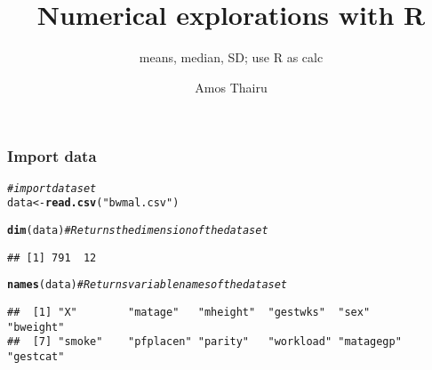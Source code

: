 \documentclass[pdf]{beamer}\usepackage[]{graphicx}\usepackage[]{color}
\title{Numerical explorations with R}
\subtitle{means, median, SD; use R as calc}
\author{Amos Thairu}
\makeatletter
\newcommand{\hlstr}[1]{\textcolor[rgb]{0.192,0.494,0.8}{#1}}%
\newcommand{\hlcom}[1]{\textcolor[rgb]{0.678,0.584,0.686}{\textit{#1}}}%
\newcommand{\hlstd}[1]{\textcolor[rgb]{0.345,0.345,0.345}{#1}}%
\newcommand{\hlkwb}[1]{\textcolor[rgb]{0.69,0.353,0.396}{#1}}%
\newcommand{\hlkwd}[1]{\textcolor[rgb]{0.737,0.353,0.396}{\textbf{#1}}}%
\newenvironment{kframe}{%
 \def\at@end@of@kframe{}%
 \ifinner\ifhmode%
  \def\at@end@of@kframe{\end{minipage}}%
  \begin{minipage}{\columnwidth}%
 \fi\fi%
 \def\FrameCommand##1{\hskip\@totalleftmargin \hskip-\fboxsep
 \colorbox{shadecolor}{##1}\hskip-\fboxsep
     \hskip-\linewidth \hskip-\@totalleftmargin \hskip\columnwidth}%
 \MakeFramed {\advance\hsize-\width
   \@totalleftmargin\z@ \linewidth\hsize
   \@setminipage}}%
 {\par\unskip\endMakeFramed%
 \at@end@of@kframe}
\newenvironment{knitrout}{}{} %
\makeatother
\begin{document}
\begin{frame}
\titlepage
\end{frame}

\begin{frame}[fragile]\frametitle{Import data}
\begin{knitrout}
\color{fgcolor}\begin{kframe}
\begin{alltt}
\hlcom{# import dataset}
\hlstd{data} \hlkwb{<-} \hlkwd{read.csv}\hlstd{(}\hlstr{"bwmal.csv"}\hlstd{)}
\end{alltt}
\end{kframe}
\end{knitrout}
\pause
\begin{knitrout}
\color{fgcolor}\begin{kframe}
\begin{alltt}
\hlkwd{dim}\hlstd{(data)}  \hlcom{#Returns the dimension of the dataset}
\end{alltt}
\begin{verbatim}
## [1] 791  12
\end{verbatim}
\end{kframe}
\end{knitrout}
\pause
\begin{knitrout}
\color{fgcolor}\begin{kframe}
\begin{alltt}
\hlkwd{names}\hlstd{(data)}  \hlcom{#Returns variable names of the dataset}
\end{alltt}
\begin{verbatim}
##  [1] "X"        "matage"   "mheight"  "gestwks"  "sex"      "bweight" 
##  [7] "smoke"    "pfplacen" "parity"   "workload" "matagegp" "gestcat"
\end{verbatim}
\end{kframe}
\end{knitrout}
\end{frame}
\end{document}
